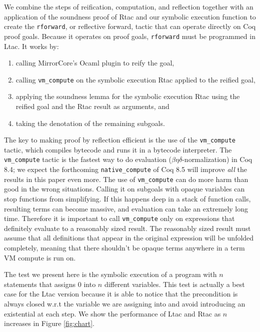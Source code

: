 \documentclass{puthesis}
\begin{document}
We combine the steps of reification, computation, and reflection
together with an application of the soundness proof of Rtac and our
symbolic execution function to create the \lstinline|rforward|, or
reflective forward, tactic that can operate directly on Coq proof
goals. Because it operates on proof goals, \lstinline|rforward| must
be programmed in Ltac.  It works by:
\begin{enumerate}
\item calling MirrorCore's Ocaml plugin to reify the goal,
\item calling \lstinline|vm_compute| on the symbolic execution Rtac
  applied to the reified goal,
\item applying the soundness lemma for the symbolic execution Rtac
  using the reified goal and the Rtac result as arguments, and
\item taking the denotation of the remaining subgoals.
\end{enumerate}
The key to making proof by reflection efficient is the use of the
\lstinline|vm_compute| tactic, which compiles bytecode and runs it in
a bytecode interpreter. The \lstinline|vm_compute| tactic is the
fastest way to do evaluation ($\beta\eta\delta$-normalization) in Coq
8.4; we expect the forthcoming \lstinline{native_compute} of Coq 8.5
will improve \emph{all} the results in this paper even more.  The use
of \lstinline|vm_compute| can do more harm than good in the wrong
situations. Calling it on subgoals with opaque variables can stop
functions from simplifying. If this happens deep in a stack of
function calls, resulting terms can become massive, and evaluation can
take an extremely long time. Therefore it is important to call
\lstinline|vm_compute| only on expressions that definitely evaluate to
a reasonably sized result. The reasonably sized result must assume
that all definitions that appear in the original expression will be
unfolded completely, meaning that there shouldn't be opaque terms
anywhere in a term VM compute is run on.

  
The test we present here is the symbolic execution of a program with
$n$ statements that assigns $0$ into $n$ different variables. This
test is actually a best case for the Ltac version because it is able
to notice that the precondition is always closed w.r.t the variable we
are assigning into and avoid introducing an existential at each
step. 
We show the performance of Ltac and
Rtac as $n$ increases in Figure \ref{fig:chart}.
\end{document}

